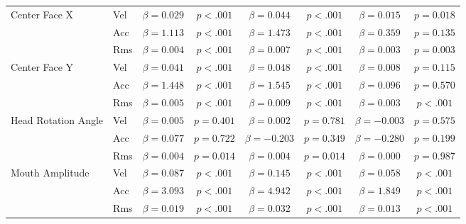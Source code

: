 \begin{tabular}{llcc|cc|cc}
\midrule
\multirow{3}{*}{Center Face X} & Vel & $\beta = 0.029$ & $p < .001$ & $\beta = 0.044$ & $p < .001$ & $\beta = 0.015$ & $p = 0.018$ \\
 & Acc & $\beta = 1.113$ & $p < .001$ & $\beta = 1.473$ & $p < .001$ & $\beta = 0.359$ & $p = 0.135$ \\
 & Rms & $\beta = 0.004$ & $p < .001$ & $\beta = 0.007$ & $p < .001$ & $\beta = 0.003$ & $p = 0.003$ \\
\midrule
\multirow{3}{*}{Center Face Y} & Vel & $\beta = 0.041$ & $p < .001$ & $\beta = 0.048$ & $p < .001$ & $\beta = 0.008$ & $p = 0.115$ \\
 & Acc & $\beta = 1.448$ & $p < .001$ & $\beta = 1.545$ & $p < .001$ & $\beta = 0.096$ & $p = 0.570$ \\
 & Rms & $\beta = 0.005$ & $p < .001$ & $\beta = 0.009$ & $p < .001$ & $\beta = 0.003$ & $p < .001$ \\
\midrule
\multirow{3}{*}{Head Rotation Angle} & Vel & $\beta = 0.005$ & $p = 0.401$ & $\beta = 0.002$ & $p = 0.781$ & $\beta = -0.003$ & $p = 0.575$ \\
 & Acc & $\beta = 0.077$ & $p = 0.722$ & $\beta = -0.203$ & $p = 0.349$ & $\beta = -0.280$ & $p = 0.199$ \\
 & Rms & $\beta = 0.004$ & $p = 0.014$ & $\beta = 0.004$ & $p = 0.014$ & $\beta = 0.000$ & $p = 0.987$ \\
\midrule
\multirow{3}{*}{Mouth Amplitude} & Vel & $\beta = 0.087$ & $p < .001$ & $\beta = 0.145$ & $p < .001$ & $\beta = 0.058$ & $p < .001$ \\
 & Acc & $\beta = 3.093$ & $p < .001$ & $\beta = 4.942$ & $p < .001$ & $\beta = 1.849$ & $p < .001$ \\
 & Rms & $\beta = 0.019$ & $p < .001$ & $\beta = 0.032$ & $p < .001$ & $\beta = 0.013$ & $p < .001$ \\
\midrule
\bottomrule
\end{tabular}